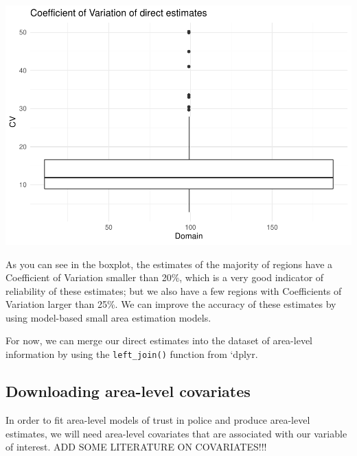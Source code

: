 \documentclass[
]{article}
\newenvironment{Shaded}{\begin{snugshade}}{\end{snugshade}}
\newcommand{\DataTypeTok}[1]{\textcolor[rgb]{0.13,0.29,0.53}{#1}}
\newcommand{\KeywordTok}[1]{\textcolor[rgb]{0.13,0.29,0.53}{\textbf{#1}}}
\newcommand{\NormalTok}[1]{#1}
\newcommand{\OperatorTok}[1]{\textcolor[rgb]{0.81,0.36,0.00}{\textbf{#1}}}
\newcommand{\StringTok}[1]{\textcolor[rgb]{0.31,0.60,0.02}{#1}}
\begin{document}
\includegraphics{chapter_files/figure-latex/dir cv boxplot-1.pdf}

As you can see in the boxplot, the estimates of the majority of regions
have a Coefficient of Variation smaller than 20\%, which is a very good
indicator of reliability of these estimates; but we also have a few
regions with Coefficients of Variation larger than 25\%. We can improve
the accuracy of these estimates by using model-based small area
estimation models.

For now, we can merge our direct estimates into the dataset of
area-level information by using the \texttt{left\_join()} function from
`dplyr.

\begin{Shaded}
\end{Shaded}

\hypertarget{downloading-area-level-covariates}{%
\subsection{Downloading area-level
covariates}\label{downloading-area-level-covariates}}

In order to fit area-level models of trust in police and produce
area-level estimates, we will need area-level covariates that are
associated with our variable of interest. ADD SOME LITERATURE ON
COVARIATES!!!
\end{document}
